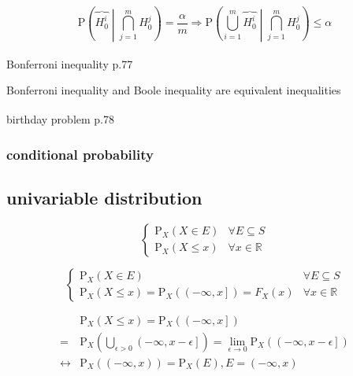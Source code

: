 \documentclass[
]{book}
\theoremstyle{definition}
\theoremstyle{definition}
\theoremstyle{definition}
\theoremstyle{definition}
\theoremstyle{remark}
\begin{document}
\[
\mathrm{P}\left(\overbrace{H_{{\scriptscriptstyle 0}}^{{\scriptscriptstyle i}}}\middle|\bigcap\limits _{j=1}^{m}H_{{\scriptscriptstyle 0}}^{{\scriptscriptstyle j}}\right)=\dfrac{\alpha}{m}\Rightarrow\mathrm{P}\left(\bigcup\limits _{i=1}^{m}\overbrace{H_{{\scriptscriptstyle 0}}^{{\scriptscriptstyle i}}}\middle|\bigcap\limits _{j=1}^{m}H_{{\scriptscriptstyle 0}}^{{\scriptscriptstyle j}}\right)\le\alpha
\]

Bonferroni inequality\textsuperscript{} p.77

Bonferroni inequality and Boole inequality are equivalent inequalities

birthday problem\textsuperscript{} p.78

\subsubsection{conditional probability}\label{conditional-probability}

\subsection{univariable distribution}\label{univariable-distribution}

\[
\begin{cases}
\mathrm{P}_{{\scriptscriptstyle X}}\left(X\in E\right) & \forall E\subseteq S\\
\mathrm{P}_{{\scriptscriptstyle X}}\left(X\le x\right) & \forall x\in\mathbb{R}
\end{cases}
\]

\[
\begin{cases}
\mathrm{P}_{{\scriptscriptstyle X}}\left(X\in E\right) & \forall E\subseteq S\\
\mathrm{P}_{{\scriptscriptstyle X}}\left(X\le x\right)=\mathrm{P}_{{\scriptscriptstyle X}}\left(\left(-\infty,x\right]\right)=F_{{\scriptscriptstyle X}}\left(x\right) & \forall x\in\mathbb{R}
\end{cases}
\]

\[
\begin{aligned}
 & \mathrm{P}_{{\scriptscriptstyle X}}\left(X\le x\right)=\mathrm{P}_{{\scriptscriptstyle X}}\left(\left(-\infty,x\right]\right)\\
= & \mathrm{P}_{{\scriptscriptstyle X}}\left(\bigcup\limits _{\epsilon>0}\left(-\infty,x-\epsilon\right]\right)=\lim_{\epsilon\rightarrow0}\mathrm{P}_{{\scriptscriptstyle X}}\left(\left(-\infty,x-\epsilon\right]\right)\\
\leftrightarrow & \mathrm{P}_{{\scriptscriptstyle X}}\left(\left(-\infty,x\right)\right)=\mathrm{P}_{{\scriptscriptstyle X}}\left(E\right),E=\left(-\infty,x\right)
\end{aligned}
\]
\end{document}
